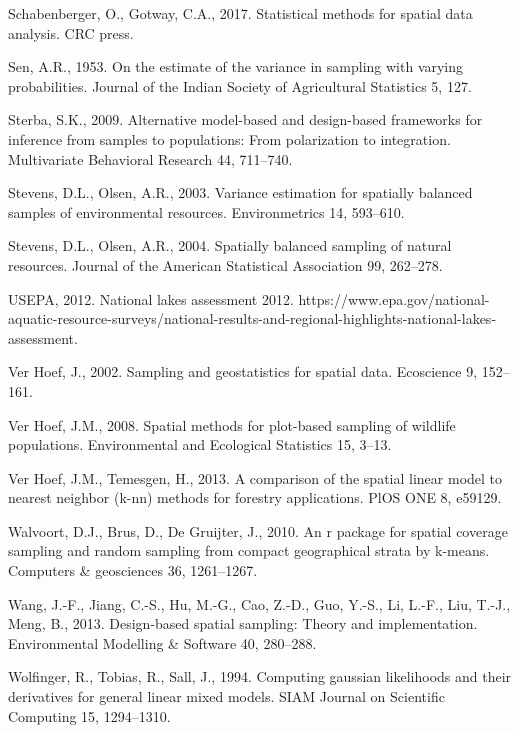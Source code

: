 \documentclass[]{elsarticle} %
\begin{document}
\leavevmode\hypertarget{ref-schabenberger2017statistical}{}%
Schabenberger, O., Gotway, C.A., 2017. Statistical methods for spatial
data analysis. CRC press.

\leavevmode\hypertarget{ref-sen1953estimate}{}%
Sen, A.R., 1953. On the estimate of the variance in sampling with
varying probabilities. Journal of the Indian Society of Agricultural
Statistics 5, 127.

\leavevmode\hypertarget{ref-sterba2009alternative}{}%
Sterba, S.K., 2009. Alternative model-based and design-based frameworks
for inference from samples to populations: From polarization to
integration. Multivariate Behavioral Research 44, 711--740.

\leavevmode\hypertarget{ref-stevens2003variance}{}%
Stevens, D.L., Olsen, A.R., 2003. Variance estimation for spatially
balanced samples of environmental resources. Environmetrics 14,
593--610.

\leavevmode\hypertarget{ref-stevens2004spatially}{}%
Stevens, D.L., Olsen, A.R., 2004. Spatially balanced sampling of natural
resources. Journal of the American Statistical Association 99, 262--278.

\leavevmode\hypertarget{ref-USEPA2012NLA}{}%
USEPA, 2012. National lakes assessment 2012.
https://www.epa.gov/national-aquatic-resource-surveys/national-results-and-regional-highlights-national-lakes-assessment.

\leavevmode\hypertarget{ref-verhoef2002sampling}{}%
Ver Hoef, J., 2002. Sampling and geostatistics for spatial data.
Ecoscience 9, 152--161.

\leavevmode\hypertarget{ref-verhoef2008spatial}{}%
Ver Hoef, J.M., 2008. Spatial methods for plot-based sampling of
wildlife populations. Environmental and Ecological Statistics 15, 3--13.

\leavevmode\hypertarget{ref-ver2013comparison}{}%
Ver Hoef, J.M., Temesgen, H., 2013. A comparison of the spatial linear
model to nearest neighbor (k-nn) methods for forestry applications. PlOS
ONE 8, e59129.

\leavevmode\hypertarget{ref-walvoort2010r}{}%
Walvoort, D.J., Brus, D., De Gruijter, J., 2010. An r package for
spatial coverage sampling and random sampling from compact geographical
strata by k-means. Computers \& geosciences 36, 1261--1267.

\leavevmode\hypertarget{ref-wang2013design}{}%
Wang, J.-F., Jiang, C.-S., Hu, M.-G., Cao, Z.-D., Guo, Y.-S., Li, L.-F.,
Liu, T.-J., Meng, B., 2013. Design-based spatial sampling: Theory and
implementation. Environmental Modelling \& Software 40, 280--288.

\leavevmode\hypertarget{ref-wolfinger1994computing}{}%
Wolfinger, R., Tobias, R., Sall, J., 1994. Computing gaussian
likelihoods and their derivatives for general linear mixed models. SIAM
Journal on Scientific Computing 15, 1294--1310.
\end{document}
